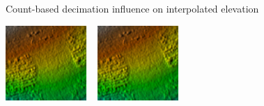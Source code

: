 \documentclass[xcolor={dvipsnames,usenames},beamer,aspectratio=43]{beamer}
\begin{document}
\begin{frame}{Count-based decimation influence on interpolated elevation}

\newcommand{\imgsize}{0.23\textwidth}

\centering
\includegraphics[width=\imgsize]{uav_all_shaded_elevation}%
~%
\includegraphics[width=\imgsize]{uav_skip_5_shaded_elevation}%

\end{frame}
\end{document}
